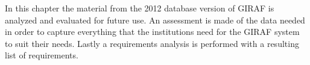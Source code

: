 In this chapter the material from the 2012 database version of GIRAF is analyzed and evaluated for future use. An assessment is made of the data needed in order to capture everything that the institutions need for the GIRAF system to suit their needs. Lastly a requirements analysis is performed with a resulting list of requirements. 